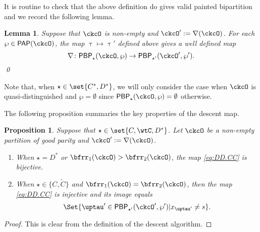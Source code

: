 \documentclass[12pt,a4paper]{amsart}
\def\DD{\nabla}
\numberwithin{equation}{section}
\newtheorem{lem}[thm]{Lemma}
\newtheorem{prop}[thm]{Proposition}
\theoremstyle{remark}
\def\DD{\nabla}
\def\PP{\mathsf{PAP}}
\def\PBP{\mathsf{PBP}}
\def\PBPop#1#2#3#4{\PBP_{#1}^{#2}(#3,#4)}
\newcommand{\PBPOP}[1][]{\PBPop{\star}{#1}{\ckcO}{\wp}}
\def\PBPOPp{\PBPop{\star'}{}{\ckcO'}{\wp'}}
\def\DD{\nabla}
\begin{document}
It is routine to check that the above definition do gives valid painted
bipartition and we record the following lemma.
\begin{lem}
  Suppose that $\ckcO$ is non-empty and $\ckcO' := \DD(\ckcO)$.
  For each $\wp\in \PP(\ckcO)$, the map $\uptau\mapsto \uptau'$ defined above
  gives a well defined map
  \begin{equation}
    \label{eq:DD.CC}
    \DD \colon \PBPOP \rightarrow \PBPOPp.
  \end{equation}
  \qed
\end{lem}

Note that, when $\star\in \set{C^{*}, D^{*}}$, we will only consider the case
when $\ckcO$ is quasi-distinguished and $\wp=\emptyset$ since
$\PBPOP = \emptyset $ otherwise.


The following proposition summaries the key properties of the descent map.
\begin{prop} \label{lem:PBPd.C}
  Suppose that $\star\in \set{C,\wtC, D^*}$. Let $\ckcO$ be a non-empty partition of good
  parity and $\ckcO' := \DD(\ckcO)$.
  \begin{enumerate}[label=(\alph*)]
    \item When $\star = D^{*}$ or $\bfrr_1(\ckcO)>\bfrr_2(\ckcO)$,
    the map \eqref{eq:DD.CC} is bijective. %
    \item When $\star\in \{C,\widetilde C\}$ and $\bfrr_1(\ckcO)=\bfrr_2(\ckcO)$,
    then the  map \eqref{eq:DD.CC} is injective and its image equals
    \[
      \Set{\uptau'\in \PBPOPp |  x_{\uptau'}\neq s}.
    \]
  \end{enumerate}
\end{prop}
\begin{proof}
  This is clear from the definition of the descent algorithm.
\end{proof}
\end{document}
